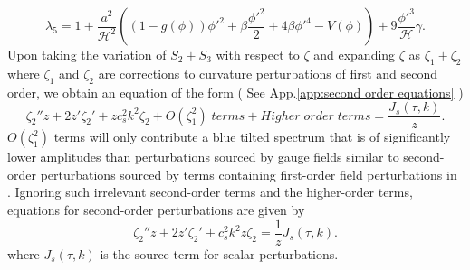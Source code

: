 \documentclass[12pt,a4paper]{article}
\numberwithin{equation}{section}
\numberwithin{equation}{section}
\begin{document}
\begin{equation}
    \lambda_5 = 1+ \frac{a^2}{\mathcal{H}^2} \left((1-g(\phi))\phi'^2 + \beta \frac{\phi'^2}{2}+4 \beta \phi'^4-V(\phi)  \right) +  9 \frac{\phi'^3}{\mathcal{H}} \gamma .
    \label{eq:lambda5}
\end{equation}
Upon taking the variation of $S_2+S_3$ with respect to $\zeta$ and expanding $\zeta$ as $\zeta_1+\zeta_2$ where $\zeta_1$ and $\zeta_2$ are corrections to curvature perturbations of first and second order, we obtain an equation of the form ( See App.\ref{app:second order equations} )
\begin{equation}
    \zeta_2'' z + 2  z' \zeta_2' + z c_s^2 k^2  \zeta_2+ O(\zeta_1^2) \; terms+ Higher\; order\; terms = \frac{J_s(\tau,k)}{z}.
    \label{eq:real3}
\end{equation}
$O(\zeta_1^2)$ terms will only contribute a blue tilted spectrum that is of significantly lower amplitudes than perturbations sourced by gauge fields similar to second-order perturbations sourced by terms containing first-order field perturbations in \cite{r1,r3}. Ignoring such irrelevant second-order terms and the higher-order terms, equations for second-order perturbations are given by
\begin{equation}
     \zeta_2'' z + 2  z' \zeta_2' + c_s^2 k^2  z \zeta_2 = \frac{1}{z}J_s(\tau,k).
     \label{eq:final}
\end{equation}
where $J_s(\tau,k)$ is the source term for scalar perturbations.
\end{document}
